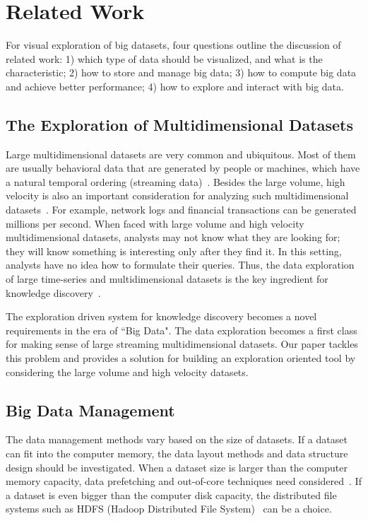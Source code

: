 \section{Related Work}

For visual exploration of big datasets, four questions outline the discussion of related work: 1) which type of data should be visualized, and what is the characteristic; 2) how to store and manage big data; 3) how to compute big data and achieve better performance; 4) how to explore and interact with big data.

\subsection{The Exploration of Multidimensional Datasets}
Large multidimensional datasets are very common and ubiquitous. Most of them are usually behavioral data that are generated by people or machines, which have a natural temporal ordering (streaming data)~\cite{Canny}. Besides the large volume,  high velocity is also an important consideration for analyzing such multidimensional datasets~\cite{IBM2011}. For example, network logs and financial transactions can be generated millions per second. When faced with large volume and high velocity multidimensional datasets, analysts may not know what they are looking for; they will know something is interesting only after they find it. In this setting,  analysts have no idea how to formulate their queries. Thus, the data exploration of large time-series and multidimensional datasets is the key ingredient for knowledge discovery~\cite{harvard}.

The exploration driven system for knowledge discovery becomes a novel requirements in the era of ``Big Data". The data exploration becomes a first class for making sense of large streaming multidimensional datasets. Our paper tackles this problem and provides a solution for building an exploration oriented tool by considering the large volume and high velocity datasets.

\subsection{Big Data Management}
The data management methods vary based on the size of datasets. If a dataset can fit into the computer memory,  the data layout methods and data structure design should be investigated. When a dataset size is larger than the computer memory capacity, data prefetching and out-of-core techniques need considered~\cite{OFC}. If a dataset is even bigger than the computer disk capacity, the distributed file systems such as HDFS (Hadoop Distributed File System)~\cite{HDFS} can be a choice. 

